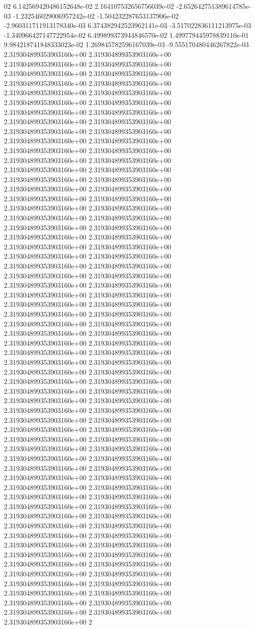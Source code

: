 02	6.142569420486152648e-02	2.164107532656756039e-02	-2.652642751389614785e-03	-1.232546029006957242e-02	-1.504232287653137906e-02	-2.960311711913178340e-03	6.374382942523962141e-03	-3.517022836111213975e-03	-1.340966427147722954e-02	6.499899373944846570e-02	1.499779445978839110e-01	9.984218741848333023e-02	1.269845782596167039e-03	-9.555170480446267822e-03
2.319304899353903160e+00	2.319304899353903160e+00	2.319304899353903160e+00	2.319304899353903160e+00	2.319304899353903160e+00	2.319304899353903160e+00	2.319304899353903160e+00	2.319304899353903160e+00	2.319304899353903160e+00	2.319304899353903160e+00	2.319304899353903160e+00	2.319304899353903160e+00	2.319304899353903160e+00	2.319304899353903160e+00	2.319304899353903160e+00	2.319304899353903160e+00	2.319304899353903160e+00	2.319304899353903160e+00	2.319304899353903160e+00	2.319304899353903160e+00	2.319304899353903160e+00	2.319304899353903160e+00	2.319304899353903160e+00	2.319304899353903160e+00	2.319304899353903160e+00	2.319304899353903160e+00	2.319304899353903160e+00	2.319304899353903160e+00	2.319304899353903160e+00	2.319304899353903160e+00	2.319304899353903160e+00	2.319304899353903160e+00	2.319304899353903160e+00	2.319304899353903160e+00	2.319304899353903160e+00	2.319304899353903160e+00	2.319304899353903160e+00	2.319304899353903160e+00	2.319304899353903160e+00	2.319304899353903160e+00	2.319304899353903160e+00	2.319304899353903160e+00	2.319304899353903160e+00	2.319304899353903160e+00	2.319304899353903160e+00	2.319304899353903160e+00	2.319304899353903160e+00	2.319304899353903160e+00	2.319304899353903160e+00	2.319304899353903160e+00	2.319304899353903160e+00	2.319304899353903160e+00	2.319304899353903160e+00	2.319304899353903160e+00	2.319304899353903160e+00	2.319304899353903160e+00	2.319304899353903160e+00	2.319304899353903160e+00	2.319304899353903160e+00	2.319304899353903160e+00	2.319304899353903160e+00	2.319304899353903160e+00	2.319304899353903160e+00	2.319304899353903160e+00	2.319304899353903160e+00	2.319304899353903160e+00	2.319304899353903160e+00	2.319304899353903160e+00	2.319304899353903160e+00	2.319304899353903160e+00	2.319304899353903160e+00	2.319304899353903160e+00	2.319304899353903160e+00	2.319304899353903160e+00	2.319304899353903160e+00	2.319304899353903160e+00	2.319304899353903160e+00	2.319304899353903160e+00	2.319304899353903160e+00	2.319304899353903160e+00	2.319304899353903160e+00	2.319304899353903160e+00	2.319304899353903160e+00	2.319304899353903160e+00	2.319304899353903160e+00	2.319304899353903160e+00	2.319304899353903160e+00	2.319304899353903160e+00	2.319304899353903160e+00	2.319304899353903160e+00	2.319304899353903160e+00	2.319304899353903160e+00	2.319304899353903160e+00	2.319304899353903160e+00	2.319304899353903160e+00	2.319304899353903160e+00	2.319304899353903160e+00	2.319304899353903160e+00	2.319304899353903160e+00	2.319304899353903160e+00	2.319304899353903160e+00	2.319304899353903160e+00	2.319304899353903160e+00	2.319304899353903160e+00	2.319304899353903160e+00	2.319304899353903160e+00	2.319304899353903160e+00	2.319304899353903160e+00	2.319304899353903160e+00	2.319304899353903160e+00	2.319304899353903160e+00	2.319304899353903160e+00	2.319304899353903160e+00	2.319304899353903160e+00	2.319304899353903160e+00	2.319304899353903160e+00	2.319304899353903160e+00	2.319304899353903160e+00	2.319304899353903160e+00	2